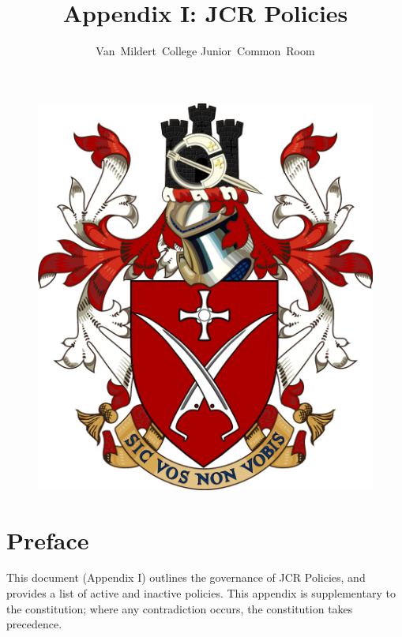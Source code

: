 \documentclass[12pt]{article}
\title{Appendix I: JCR Policies}
\author{Van~Mildert~College Junior~Common~Room}
\date{\thedate}
\begin{document}
\begin{titlepage}  %
    \maketitle
    \begin{figure}[h]
        \includegraphics[scale=0.25]{arms.png}  %
        \centering
    \end{figure}
    \thispagestyle{empty}
\end{titlepage}
\setcounter{page}{2}  %

\section{Preface}
This document (Appendix I) outlines the governance of JCR Policies, and provides a list of active and inactive policies. This appendix is supplementary to the constitution; where any contradiction occurs, the constitution takes precedence.
\end{document}
